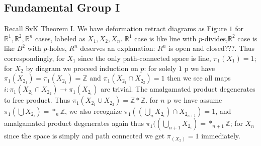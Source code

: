 \documentclass[11pt]{article}
\def\Z{{\mathbb Z}}
\def\R{{\mathbb R}}
\theoremstyle{remark}
\begin{document}
\begin{itemize}
    
    \subsection*{Fundamental Group I}
  Recall SvK Theorem I. We have deformation retract diagrams as Figure $1$ for $\R^1,\R^2,\R^n$ cases, labeled as $X_1,X_2,X_n$. $\R^1$ case is like line with $p$-divides,$\R^2$ case is like $B^2$ with $p$-holes, $R^n$ deserves an explanation: $R^n$ is open and closed???. Thus correspondingly, for $X_1$ since the only path-connected space is line, $\pi_1(X_1)=1$;  for $X_2$ by diagram we proceed induction on $p$: for solely $1$ p we have $\pi_1(X_2_1)=\pi_1(X_2_1)=\Z$ and $\pi_1(X_2_1\cap X_2_2)=1$ then we see all maps $i:\pi_1(X_2_1\cap X_2_2) \rightarrow \pi_1(X_2_i)$ are trivial. The amalgamated product degenerates to free product. Thus $\pi_1(X_2_1\cup X_2_2)=\Z*\Z$. for $n$ p we have assume $\pi_1(\bigcup X_2_i)=*_n\Z$, we also recognize  $\pi_1((\bigcup_n X_2_i)\cap X_2_{n+1})=1$, and amalgamated product degenerates again thus $\pi_1((\bigcup_{n+1} X_2_i)=*_{n+1}\Z$; for $X_n$ since the space is simply and path connected we get $\pi_(X_2)=1$ immediately. 
    
\end{itemize}
\end{document}
